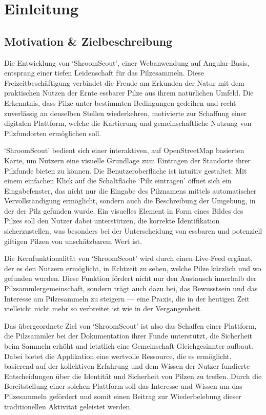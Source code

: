 \section{Einleitung}

\subsection{Motivation \& Zielbeschreibung}

Die Entwicklung von `ShroomScout', einer Webanwendung auf Angular-Basis, entsprang einer tiefen Leidenschaft
für das Pilzesammeln. Diese Freizeitbeschäftigung verbindet die Freude am Erkunden der Natur mit dem praktischen
Nutzen der Ernte essbarer Pilze aus ihrem natürlichen Umfeld. Die Erkenntnis, dass Pilze unter bestimmten Bedingungen
gedeihen und recht zuverlässig an denselben Stellen wiederkehren, motivierte zur Schaffung einer digitalen Plattform,
welche die Kartierung und gemeinschaftliche Nutzung von Pilzfundorten ermöglichen soll.

`ShroomScout' bedient sich einer interaktiven, auf OpenStreetMap basierten Karte, um Nutzern eine visuelle
Grundlage zum Eintragen der Standorte ihrer Pilzfunde bieten zu können. Die Benutzeroberfläche ist intuitiv gestaltet:
Mit einem einfachen Klick auf die Schaltfläche `Pilz eintragen' öffnet sich ein Eingabefenster, das nicht nur die
Eingabe des Pilznamens mittels automatischer Vervollständigung ermöglicht, sondern auch die Beschreibung der Umgebung,
in der der Pilz gefunden wurde. Ein visuelles Element in Form eines Bildes des Pilzes soll den Nutzer dabei unterstützen,
die korrekte Identifikation sicherzustellen, was besonders bei der Unterscheidung von essbaren und potenziell giftigen
Pilzen von unschätzbarem Wert ist.

Die Kernfunktionalität von `ShroomScout' wird durch einen Live-Feed ergänzt, der es den Nutzern ermöglicht,
in Echtzeit zu sehen, welche Pilze kürzlich und wo gefunden wurden. Diese Funktion fördert nicht nur den
Austausch innerhalb der Pilzsammlergemeinschaft, sondern trägt auch dazu bei, das Bewusstsein und das
Interesse am Pilzesammeln zu steigern --- eine Praxis, die in der heutigen Zeit vielleicht nicht mehr so
verbreitet ist wie in der Vergangenheit.

Das übergeordnete Ziel von `ShroomScout' ist also das Schaffen einer Plattform, die Pilzsammler bei der Dokumentation
ihrer Funde unterstützt, die Sicherheit beim Sammeln erhöht und letztlich eine Gemeinschaft Gleichgesinnter
aufbaut. Dabei bietet die Applikation eine wertvolle Ressource, die es ermöglicht, basierend auf der kollektiven Erfahrung
und dem Wissen der Nutzer fundierte Entscheidungen über die Identität und Sicherheit von Pilzen zu treffen. Durch die
Bereitstellung einer solchen Plattform soll das Interesse und Wissen um das Pilzesammeln gefördert und somit einen Beitrag
zur Wiederbelebung dieser traditionellen Aktivität geleistet werden.

